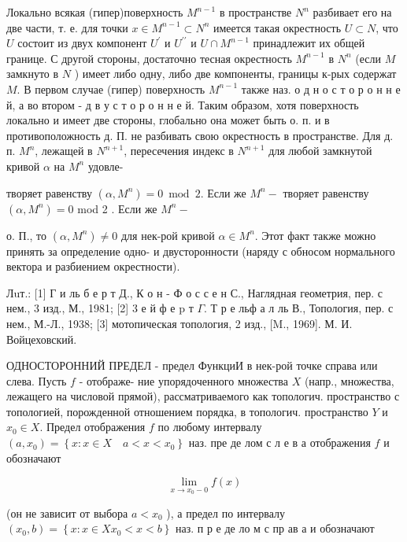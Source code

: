 \documentclass[10pt]{article}
\begin{document}
Локально всякая (гипер)поверхность $M^{n-1}$ в пространстве $N^{n}$ разбивает его на две части, т. е. для точки $x \in M^{n-1} \subset N^{n}$ имеется такая окрестность $U \subset N$, что $U$ состоит из двух компонент $U^{\prime}$ и $U^{\prime \prime}$ и $U \cap M^{n-1}$ принадлежит их общей границе. С другой стороны, достаточно тесная окрестность $M^{n-1}$ в $N^{n}$ (если $M$ замкнуто в $N$ ) имеет либо одну, либо две компоненты, границы к-рых содержат $M$. В первом случае (гипер) поверхность $M^{n-1}$ также наз. о д н о с т о р о н н е й, а во втором - д в у с т о р о н н е й. Таким образом, хотя поверхность локально и имеет две стороны, глобально она может быть о. п. и в противоположность д. П. не разбивать свою окрестность в пространстве. Для д. п. $M^{n}$, лежащей в $N^{n+1}$, пересечения индекс в $N^{n+1}$ для любой замкнутой кривой $\alpha$ на $M^{n}$ удовле-

творяет равенству $\left(\alpha, M^{n}\right)=0 \bmod 2$. Если же $M^{n}-$ творяет равенству $\left(\alpha, M^{n}\right)=0$ mod 2 . Если же $M^{n}-$

о. П., то $\left(\alpha, M^{n}\right) \neq 0$ для нек-рой кривой $\alpha \in M^{n}$. Этот факт также можно принять за определение одно- и двусторонности (наряду с обносом нормального вектора и разбиением окрестности).



Лuт.: [1] Г и ль б е р т Д., К о н - Ф о с с е н С., Наглядная геометрия, пер. с нем., 3 изд., М., 1981; [2] 3 е й ф е p т $\Gamma$. Т р е льф а л ль В., Топология, пер. с нем., М.-Л., 1938; [3] мотопическая топология, 2 изд., [M., 1969]. М. И. Войцеховский.



ОДНОСТОРОННИЙ ПРЕДЕЛ - предел ФункциИ в нек-рой точке справа или слева. Пусть $f$ - отображе- ние упорядоченного множества $X$ (напр., множества, лежащего на числовой прямой), рассматриваемого как топологич. пространство с топологией, порожденной отношением порядка, в топологич. пространство $Y$ и $x_{0} \in X$. Предел отображения $f$ по любому интервалу $\left(a, x_{0}\right)=\left\{x: x \in X \quad a<x<x_{0}\right\}$ наз. пре де лом с л е в а отображения $f$ и обозначают



\[

\lim _{x \rightarrow x_{0}-0} f(x)

\]



(он не зависит от выбора $a<x_{0}$ ), а предел по интервалу $\left(x_{0}, b\right)=\left\{x: x \in X x_{0}<x<b\right\}$ наз. п р е де ло м с пр ав а и обозначают
\end{document}
